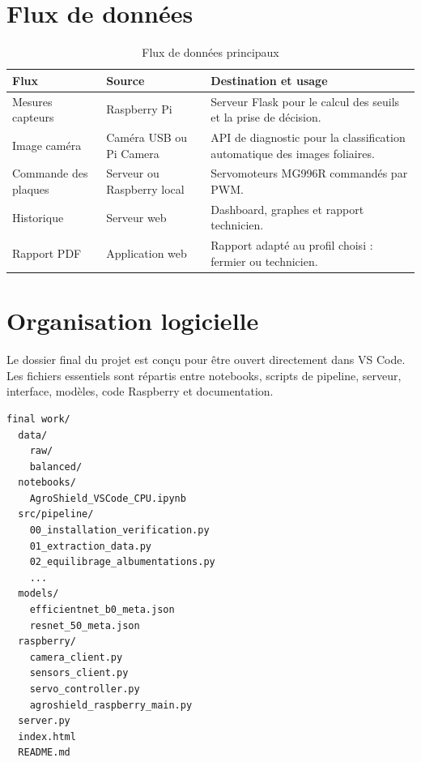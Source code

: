 ﻿\documentclass[11pt,a4paper,openany]{report}
\begin{document}
\section{Flux de données}
\begin{table}[H]
\centering
\renewcommand{\arraystretch}{1.3}

\begin{tabularx}{\textwidth}{|p{3cm}|p{3cm}|X|}
\hline
\textbf{Flux} & \textbf{Source} & \textbf{Destination et usage} \\
\hline

Mesures capteurs &
Raspberry Pi &
Serveur Flask pour le calcul des seuils et la prise de décision. \\
\hline

Image caméra &
Caméra USB ou Pi Camera &
API de diagnostic pour la classification automatique des images foliaires. \\
\hline

Commande des plaques &
Serveur ou Raspberry local &
Servomoteurs MG996R commandés par PWM. \\
\hline

Historique &
Serveur web &
Dashboard, graphes et rapport technicien. \\
\hline

Rapport PDF &
Application web &
Rapport adapté au profil choisi : fermier ou technicien. \\
\hline

\end{tabularx}

\caption{Flux de données principaux}
\end{table}

\section{Organisation logicielle}
Le dossier final du projet est conçu pour être ouvert directement dans VS Code. Les fichiers essentiels sont répartis entre notebooks, scripts de pipeline, serveur, interface, modèles, code Raspberry et documentation.

\begin{lstlisting}[style=codeagro,caption={Organisation logique du projet dans VS Code}]
final work/
  data/
    raw/
    balanced/
  notebooks/
    AgroShield_VSCode_CPU.ipynb
  src/pipeline/
    00_installation_verification.py
    01_extraction_data.py
    02_equilibrage_albumentations.py
    ...
  models/
    efficientnet_b0_meta.json
    resnet_50_meta.json
  raspberry/
    camera_client.py
    sensors_client.py
    servo_controller.py
    agroshield_raspberry_main.py
  server.py
  index.html
  README.md
\end{lstlisting}
\end{document}
